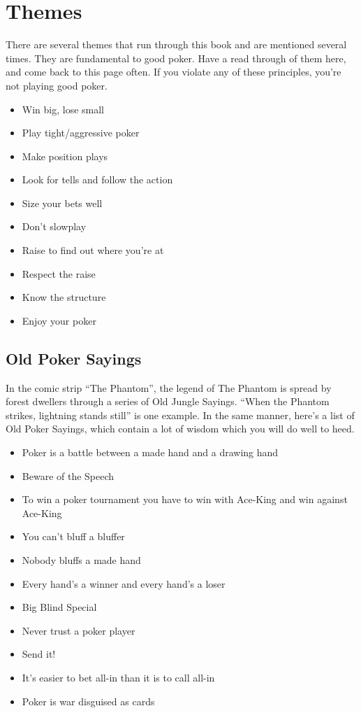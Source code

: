 \chapter{Themes}


There are several themes that run through this book and are mentioned
several times. They are fundamental to good poker. Have a read through
of them here, and come back to this page often. If you violate any of
these principles, you're not playing good poker.

\begin{itemize}
  \item Win big, lose small
  \item Play tight/aggressive poker
  \item Make position plays
  \item Look for tells and follow the action
  \item Size your bets well
  \item Don't slowplay
  \item Raise to find out where you're at
  \item Respect the raise
  \item Know the structure
  \item Enjoy your poker
\end{itemize}

\section{Old Poker Sayings}

In the comic strip ``The Phantom'', the legend of The Phantom is
spread by forest dwellers through a series of Old Jungle Sayings.
``When the Phantom strikes, lightning stands still'' is one example.
In the same manner, here's a list of Old Poker Sayings, which contain
a lot of wisdom which you will do well to heed.

\begin{itemize}
  \item Poker is a battle between a made hand and a drawing hand
  \item Beware of the Speech
  \item To win a poker tournament you have to win with Ace-King and win
    against Ace-King
  \item You can't bluff a bluffer
  \item Nobody bluffs a made hand
  \item Every hand's a winner and every hand's a loser
  \item Big Blind Special
  \item Never trust a poker player
  \item Send it!
  \item It's easier to bet all-in than it is to call all-in
  \item Poker is war disguised as cards
\end{itemize}

